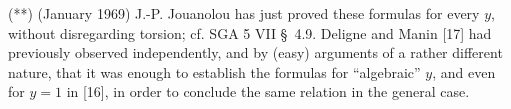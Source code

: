 \medskip

\noindent(**) (January 1969) J.-P. Jouanolou has just proved these formulas
for every $y$, without disregarding torsion; cf. SGA 5 VII \S~4.9. Deligne
and Manin [17] had previously observed independently, and by (easy)
arguments of a rather different nature, that it was enough to establish the
formulas for ``algebraic'' $y$, and even for $y=1$ in [16], in order to
conclude the same relation in the general case.


